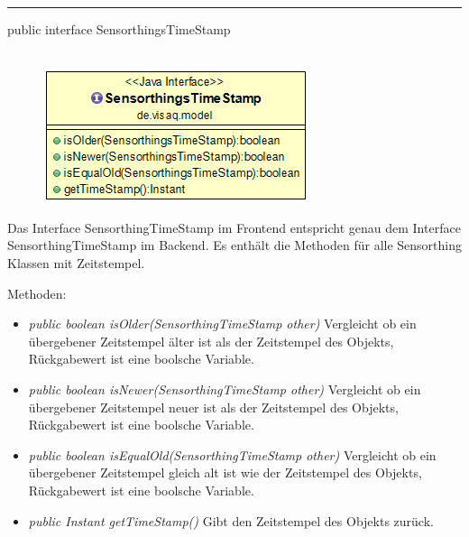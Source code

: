\rule{\textwidth}{0.4pt}
public interface SensorthingsTimeStamp
\\\\
\begin{minipage}{0.3\textwidth}
	\begin{figure}[H]
		\includegraphics[scale = 0.5
		]{media/frontend/model/SensorthingTimeStampClass.png}
	\end{figure}
\end{minipage} \hfill
\begin{minipage}{0.6\textwidth}
	Das Interface SensorthingTimeStamp im Frontend entspricht genau dem Interface SensorthingTimeStamp im Backend. Es enthält die Methoden für alle Sensorthing Klassen mit Zeitstempel.
\end{minipage}

Methoden:
\begin{itemize}
	\item \emph{public boolean isOlder(SensorthingTimeStamp other)} Vergleicht ob ein übergebener Zeitstempel älter ist als der Zeitstempel des Objekts, Rückgabewert ist eine boolsche Variable.
	\item \emph{public boolean isNewer(SensorthingTimeStamp other)} Vergleicht ob ein übergebener Zeitstempel neuer ist als der Zeitstempel des Objekts, Rückgabewert ist eine boolsche Variable.
	\item \emph{public boolean isEqualOld(SensorthingTimeStamp other)} Vergleicht ob ein übergebener Zeitstempel gleich alt ist wie der Zeitstempel des Objekts, Rückgabewert ist eine boolsche Variable.
	\item \emph{public Instant getTimeStamp()} Gibt den Zeitstempel des Objekts zurück.
\end{itemize}

